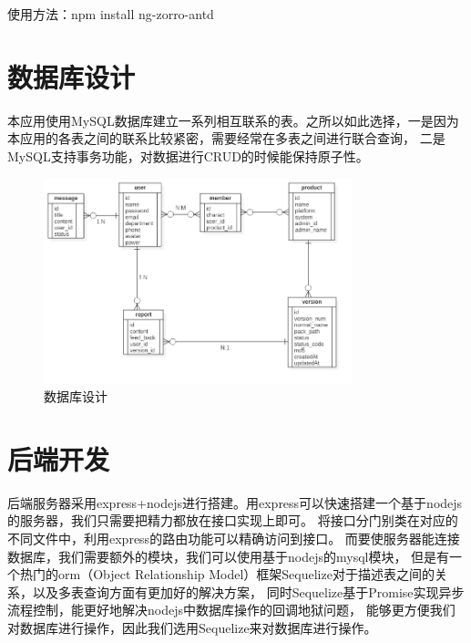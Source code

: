 使用方法：npm install ng-zorro-antd
\section{数据库设计}
\label{sec:database_design}
本应用使用MySQL数据库建立一系列相互联系的表。之所以如此选择，一是因为本应用的各表之间的联系比较紧密，需要经常在多表之间进行联合查询，
二是MySQL支持事务功能，对数据进行CRUD的时候能保持原子性。
\begin{figure}[h]
	\centering
	\includegraphics[width=0.8\textwidth]{image/UML/ERDDiagram.png}
	\caption{数据库设计}
	\label{fig:database}
\end{figure}
\section{后端开发}
\label{sec:Backend_development }
后端服务器采用express+nodejs进行搭建。用express可以快速搭建一个基于nodejs的服务器，我们只需要把精力都放在接口实现上即可。
将接口分门别类在对应的不同文件中，利用express的路由功能可以精确访问到接口。
而要使服务器能连接数据库，我们需要额外的模块，我们可以使用基于nodejs的mysql模块，
但是有一个热门的orm（Object Relationship Model）框架Sequelize对于描述表之间的关系，以及多表查询方面有更加好的解决方案，
同时Sequelize基于Promise实现异步流程控制，能更好地解决nodejs中数据库操作的回调地狱问题，
能够更方便我们对数据库进行操作，因此我们选用Sequelize来对数据库进行操作。